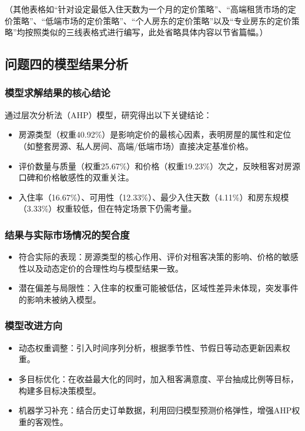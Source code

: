 \documentclass[12pt]{article}
\begin{document}
\begin{CJK}{UTF8}{gbsn}
	（其他表格如“针对设定最低入住天数为一个月的定价策略”、“高端租赁市场的定价策略”、“低端市场的定价策略”、“个人房东的定价策略”以及“专业房东的定价策略”均按照类似的三线表格式进行编写，此处省略具体内容以节省篇幅。）
	
	\subsection{问题四的模型结果分析}
	
	\subsubsection{模型求解结果的核心结论}
	通过层次分析法（AHP）模型，研究得出以下关键结论：
	\begin{itemize}
		\item 房源类型（权重40.92\%）是影响定价的最核心因素，表明房屋的属性和定位（如整套房源、私人房间、高端/低端市场）直接决定基准价格。
		\item 评价数量与质量（权重25.67\%）和价格（权重19.23\%）次之，反映租客对房源口碑和价格敏感性的双重关注。
		\item 入住率（16.67\%）、可用性（12.33\%）、最少入住天数（4.11\%）和房东规模（3.33\%）权重较低，但在特定场景下仍需考量。
	\end{itemize}
	
	\subsubsection{结果与实际市场情况的契合度}
	\begin{itemize}
		\item 符合实际的表现：房源类型的核心作用、评价对租客决策的影响、价格的敏感性以及动态定价的合理性均与模型结果一致。
		\item 潜在偏差与局限性：入住率的权重可能被低估，区域性差异未体现，突发事件的影响未被纳入模型。
	\end{itemize}
	
	\subsubsection{模型改进方向}
	\begin{itemize}
		\item 动态权重调整：引入时间序列分析，根据季节性、节假日等动态更新因素权重。
		\item 多目标优化：在收益最大化的同时，加入租客满意度、平台抽成比例等目标，构建多目标决策模型。
		\item 机器学习补充：结合历史订单数据，利用回归模型预测价格弹性，增强AHP权重的客观性。
	\end{itemize}
	

\end{CJK}
\end{document}
